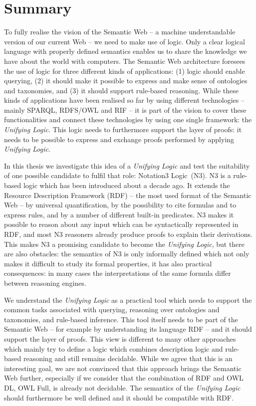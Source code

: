 \chapter{Summary}
\setlength{\epigraphrule}{0pt}
\setlength{\epigraphwidth}{0.48\textwidth}

To fully realise the vision of the Semantic Web -- a machine understandable version of our current Web -- we need to make use of logic. 
Only a clear logical language with properly defined semantics enables us to share the knowledge we have about the world with computers.
The Semantic Web architecture foresees the use of logic for three different kinds of applications: (1) logic should enable querying,
(2) it should make it possible to express and make sense of ontologies and taxonomies, and (3) it should support rule-based reasoning. 
While these kinds of applications have been realised so far by using different technologies -- mainly SPARQL, RDFS/OWL and RIF --
it is part of the vision to cover these functionalities and connect these technologies by using one single framework: the \emph{Unifying Logic}. 
This logic needs to furthermore support the layer of proofs: it needs to be possible to express and exchange proofs performed by applying \emph{Unifying Logic}.

In this thesis we investigate this idea of a \emph{Unifying Logic} and test the suitability of one possible candidate to fulfil that role: Notation3 Logic~(N3).
N3 is a rule-based logic which has been introduced about a decade ago. It extends the Resource Description Framework (RDF) -- the most used format of the Semantic Web -- 
by universal quantification, by the possibility to cite formulas and to express rules, and by a number of different built-in predicates.
N3 makes it possible to reason about any input which can be syntactically represented in RDF, and most N3 reasoners already produce proofs to explain their 
derivations. This makes N3 a promising candidate to become the \emph{Unifying Logic}, but there are also obstacles: 
the semantics of N3 is only informally defined which not only 
makes it difficult to study its formal properties,
it has also practical consequences: in many cases the interpretations of the same formula differ between reasoning engines. 

We understand the \emph{Unifying Logic} 
as a practical tool which needs to support the common tasks associated with querying, reasoning over ontologies and taxonomies, and rule-based inference.
This tool itself needs to be part of the Semantic Web -- for example by understanding its language RDF -- and it should support the layer of proofs.
This view is different to many other approaches which mainly try to define a logic which combines description logic and rule-based reasoning and still remains decidable.
While we agree that this is an interesting goal, we are not convinced that this approach brings the Semantic Web further, especially if we consider that the combination 
of RDF and OWL DL, OWL Full, is already not decidable. The semantics of the \emph{Unifying Logic} should furthermore be well defined and it should be compatible with RDF.

